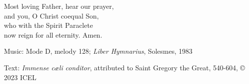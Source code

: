 \hymn



\begin{underhymnverse}
Most loving Father, hear our prayer,\\
and you, O Christ coequal Son,\\
who with the Spirit Paraclete\\
now reign for all eternity. Amen.
\end{underhymnverse}

\begin{hymnsource}
Music: Mode D, melody 128; \emph{Liber Hymnarius}, Solesmes, 1983

Text: \emph{Immense cæli conditor}, attributed to Saint Gregory the Great, 540-604, © 2023 ICEL
\end{hymnsource}
